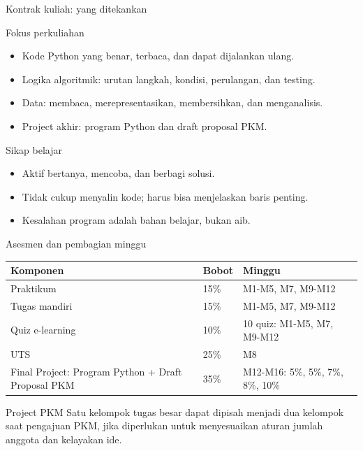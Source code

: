 \documentclass[aspectratio=169,11pt]{beamer}
\begin{document}
\begin{frame}{Kontrak kuliah: yang ditekankan}
\begin{block}{Fokus perkuliahan}
\begin{itemize}
  \item Kode Python yang benar, terbaca, dan dapat dijalankan ulang.
  \item Logika algoritmik: urutan langkah, kondisi, perulangan, dan testing.
  \item Data: membaca, merepresentasikan, membersihkan, dan menganalisis.
  \item Project akhir: program Python dan draft proposal PKM.
\end{itemize}
\end{block}
\begin{block}{Sikap belajar}
\begin{itemize}
  \item Aktif bertanya, mencoba, dan berbagi solusi.
  \item Tidak cukup menyalin kode; harus bisa menjelaskan baris penting.
  \item Kesalahan program adalah bahan belajar, bukan aib.
\end{itemize}
\end{block}
\end{frame}

\begin{frame}{Asesmen dan pembagian minggu}
\small
\begin{tabular}{p{3.5cm}p{2.2cm}p{6.2cm}}
\toprule
Komponen & Bobot & Minggu \\
\midrule
Praktikum & 15\% & M1-M5, M7, M9-M12 \\
Tugas mandiri & 15\% & M1-M5, M7, M9-M12 \\
Quiz e-learning & 10\% & 10 quiz: M1-M5, M7, M9-M12 \\
UTS & 25\% & M8 \\
Final Project: Program Python + Draft Proposal PKM & 35\% & M12-M16: 5\%, 5\%, 7\%, 8\%, 10\% \\
\bottomrule
\end{tabular}
\vspace{2mm}
\begin{block}{Project PKM}
Satu kelompok tugas besar dapat dipisah menjadi dua kelompok saat pengajuan PKM, jika diperlukan untuk menyesuaikan aturan jumlah anggota dan kelayakan ide.
\end{block}
\end{frame}
\end{document}
